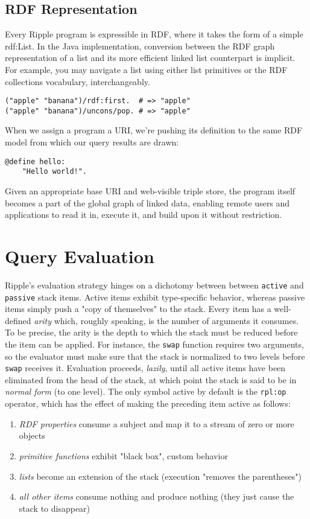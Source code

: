 \documentclass[runningheads]{llncs}
\begin{document}
\subsection{RDF Representation}
Every Ripple program is expressible in RDF, where it takes the form of a simple rdf:List.  In the Java implementation, conversion between the RDF graph representation of a list and its more efficient linked list counterpart is implicit.  For example, you may navigate a list using either list primitives or the RDF collections vocabulary, interchangeably.
\begin{verbatim}
("apple" "banana")/rdf:first.  # => "apple"
("apple" "banana")/uncons/pop. # => "apple"
\end{verbatim}

When we assign a program a URI, we're pushing its definition to the same RDF model from which our query results are drawn:
\begin{verbatim}
@define hello:
    "Hello world!".
\end{verbatim}

Given an appropriate base URI and web-visible triple store, the program itself becomes a part of the global graph of linked data, enabling remote users and applications to read it in, execute it, and build upon it without restriction.


\section{Query Evaluation}

Ripple's evaluation strategy hinges on a dichotomy between between \texttt{active} and \texttt{passive} stack items.  Active items exhibit type-specific behavior, whereas passive items simply push a "copy of themselves" to the stack.  Every item has a well-defined \textit{arity} which, roughly speaking, is the number of arguments it consumes.  To be precise, the arity is the depth to which the stack must be reduced before the item can be applied.  For instance, the \texttt{swap} function requires two arguments, so the evaluator must make sure that the stack is normalized to two levels before \texttt{swap} receives it.  Evaluation proceeds, \textit{lazily}, until all active items have been eliminated from the head of the stack, at which point the stack is said to be in \textit{normal form} (to one level).  The only symbol active by default is the \texttt{rpl:op} operator, which has the effect of making the preceding item active as follows:
\begin{enumerate}
\item \textit{RDF properties} consume a subject and map it to a stream of zero or more objects
\item \textit{primitive functions} exhibit "black box", custom behavior
\item \textit{lists} become an extension of the stack (execution "removes the parentheses")
\item \textit{all other items} consume nothing and produce nothing (they just cause the stack to disappear)
\end{enumerate}
\end{document}

